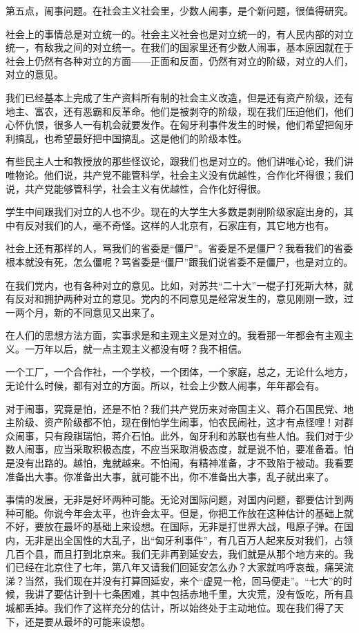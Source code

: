 第五点，闹事问题。在社会主义社会里，少数人闹事，是个新问题，很值得研究。

社会上的事情总是对立统一的。社会主义社会也是对立统一的，有人民内部的对立统一，有敌我之间的对立统一。在我们的国家里还有少数人闹事，基本原因就在于社会上仍然有各种对立的方面——正面和反面，仍然有对立的阶级，对立的人们，对立的意见。

我们已经基本上完成了生产资料所有制的社会主义改造，但是还有资产阶级，还有地主、富农，还有恶霸和反革命。他们是被剥夺的阶级，现在我们压迫他们，他们心怀仇恨，很多人一有机会就要发作。在匈牙利事件发生的时候，他们希望把匈牙利搞乱，也希望最好把中国搞乱。这是他们的阶级本性。

有些民主人士和教授放的那些怪议论，跟我们也是对立的。他们讲唯心论，我们讲唯物论。他们说，共产党不能管科学，社会主义没有优越性，合作化坏得很；我们说，共产党能够管科学，社会主义有优越性，合作化好得很。

学生中间跟我们对立的人也不少。现在的大学生大多数是剥削阶级家庭出身的，其中有反对我们的人，毫不奇怪。这样的人北京有，石家庄有，其它地方也有。

社会上还有那样的人，骂我们的省委是“僵尸”。省委是不是僵尸？我看我们的省委根本就没有死，怎么僵呢？骂省委是“僵尸”跟我们说省委不是僵尸，也是对立的。

在我们党内，也有各种对立的意见。比如，对苏共“二十大”一棍子打死斯大林，就有反对和拥护两种对立的意见。党内的不同意见是经常发生的，意见刚刚一致，过一两个月，新的不同意见又出来了。

在人们的思想方法方面，实事求是和主观主义是对立的。我看那一年都会有主观主义。一万年以后，就一点主观主义都没有呀？我不相信。

一个工厂，一个合作社，一个学校，一个团体，一个家庭，总之，无论什么地方，无论什么时候，都有对立的方面。所以，社会上少数人闹事，年年都会有。

对于闹事，究竟是怕，还是不怕？我们共产党历来对帝国主义、蒋介石国民党、地主阶级、资产阶级都不怕，现在倒怕学生闹事，怕农民闹社，这才有点怪哩！对群众闹事，只有段祺瑞怕，蒋介石怕。此外，匈牙利和苏联也有些人怕。我们对于少数人闹事，应当采取积极态度，不应当采取消极态度，就是说不怕，要准备着。怕是没有出路的。越怕，鬼就越来。不怕闹，有精神准备，才不致陷于被动。我看要准备出大事。你准备出大事，就可能不出，你不准备出大事，乱子就出来了。

事情的发展，无非是好坏两种可能。无论对国际问题，对国内问题，都要估计到两种可能。你说今年会太平，也许会太平。但是，你把工作放在这种估计的基础上就不好，要放在最坏的基础上来设想。在国际，无非是打世界大战，甩原子弹。在国内，无非是出全国性的大乱子，出“匈牙利事件”，有几百万人起来反对我们，占领几百个县，而且打到北京来。我们无非再到延安去，我们就是从那个地方来的。我们已经在北京住了七年，第八年又请我们回延安怎么办？大家就呜呼哀哉，痛哭流涕？当然，我们现在并没有打算回延安，来个“虚晃一枪，回马便走”。“七大”的时候，我讲了要估计到十七条困难，其中包括赤地千里，大灾荒，没有饭吃，所有县城都丢掉。我们作了这样充分的估计，所以始终处于主动地位。现在我们得了天下，还是要从最坏的可能来设想。

